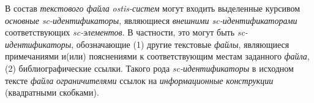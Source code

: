 \begin{SCn}
    В состав \textit{текстового файла} \textit{ostis-систем} могут входить выделенные курсивом \textit{основные sc-идентификаторы}, являющиеся \textit{внешними sc-идентификаторами} соответствующих \textit{sc-элементов}.
    В частности, это могут быть \textit{sc-идентификаторы}, обозначающие (1) другие текстовые \textit{файлы}, являющиеся примечаниями и(или) пояснениями к соответствующим местам заданного \textit{файла}, (2) библиографические ссылки.
    Такого рода \textit{sc-идентификаторы} в исходном тексте \textit{файла} \textit{ограничителями} ссылок на \textit{информационные конструкции} (квадратными скобками).

        \begin{scnindent}
        \end{scnindent}

\end{SCn}

%